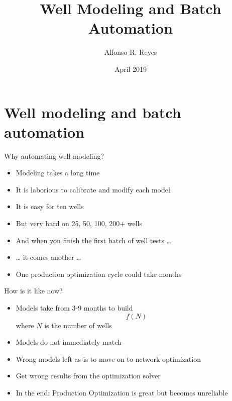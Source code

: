 \documentclass[14pt,ignorenonframetext,]{beamer}
\title{Well Modeling and Batch Automation}
\author{Alfonso R. Reyes}
\date{April 2019}
\providecommand{\tightlist}{%
  \setlength{\itemsep}{0pt}\setlength{\parskip}{0pt}}
\begin{document}
\frame{\titlepage}

\hypertarget{well-modeling-and-batch-automation}{%
\section{Well modeling and batch
automation}\label{well-modeling-and-batch-automation}}

\begin{frame}{Why automating well modeling?}
\protect\hypertarget{why-automating-well-modeling}{}

\fontsize{13}{15}\sf

\begin{itemize}
\tightlist
\item
  Modeling takes a long time
\item
  It is laborious to calibrate and modify each model
\item
  It is easy for ten wells
\item
  But very hard on 25, 50, 100, 200+ wells
\item
  And when you finish the first batch of well tests \ldots{}
\item
  \ldots{} it comes another \ldots{}
\item
  One production optimization cycle could take months
\end{itemize}

\end{frame}

\begin{frame}{How is it like now?}
\protect\hypertarget{how-is-it-like-now}{}

\fontsize{13}{15}\sf

\begin{itemize}
\tightlist
\item
  Models take from 3-9 months to build \[f(N)\] where \(N\) is the
  number of wells
\item
  Models do not immediately match
\item
  Wrong models left as-is to move on to network optimization
\item
  Get wrong results from the optimization solver
\item
  In the end: \newline \fontsize{12}{14}\sf
  \alert{Production Optimization is great but becomes unreliable}
\end{itemize}

\end{frame}
\end{document}
